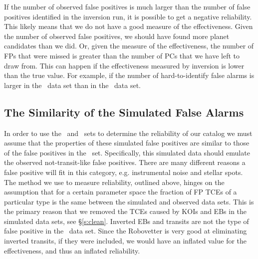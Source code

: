 
If the number of observed false positives is much larger than the number of false positives identified in the inversion run, it is possible to get a negative reliability. This likely means that we do not have a good measure of the effectiveness.  Given the number of observed false positives, we should have found more planet candidates than we did. Or, given the measure of the effectiveness, the number of FPs that were missed is greater than the number of PCs that we have left to draw from.  This can happen if the effectiveness measured by inversion is lower than the true value. For example, if the number of hard-to-identify false alarms is larger in the \invtce\ data set than in the \opstce\ data set.   

\subsection{The Similarity of the Simulated False Alarms}
\label{s:simularity}
In order to use the \scrtce\ and \invtce\ sets to determine the reliability of our catalog we must assume that the properties of these simulated false positives are similar to those of the false positives in the \opstce\ set.  Specifically, this simulated data should emulate the observed not-transit-like false positives.  There are many different reasons a false positive will fit in this category, e.g. instrumental noise and stellar spots. The method we use to measure reliability, outlined above, hinges on the assumption that for a certain parameter space the fraction of FP TCEs of a particular type is the same between the simulated and observed data sets.  This is the primary reason that we removed the TCEs caused by KOIs and EBs in the simulated data sets, see \S\ref{s:clean}. Inverted EBs and transits are not the type of false positive in the \opstce\ data set.  Since the Robovetter is very good at eliminating inverted transits, if they were included, we would have an inflated value for the effectiveness, and thus an inflated reliability. 

